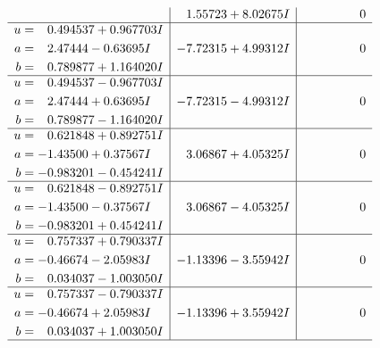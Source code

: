 \documentclass[1p]{elsarticle_modified}
\theoremstyle{definition}
\begin{document}
$$\begin{array}{c|c|c}
 & \phantom{-}1.55723 + 8.02675 I & \phantom{-0.000000 } 0 \\ \hline\begin{aligned}
u &= \phantom{-}0.494537 + 0.967703 I \\
a &= \phantom{-}2.47444 - 0.63695 I \\
b &= \phantom{-}0.789877 + 1.164020 I\end{aligned}
 & -7.72315 + 4.99312 I & \phantom{-0.000000 } 0 \\ \hline\begin{aligned}
u &= \phantom{-}0.494537 - 0.967703 I \\
a &= \phantom{-}2.47444 + 0.63695 I \\
b &= \phantom{-}0.789877 - 1.164020 I\end{aligned}
 & -7.72315 - 4.99312 I & \phantom{-0.000000 } 0 \\ \hline\begin{aligned}
u &= \phantom{-}0.621848 + 0.892751 I \\
a &= -1.43500 + 0.37567 I \\
b &= -0.983201 - 0.454241 I\end{aligned}
 & \phantom{-}3.06867 + 4.05325 I & \phantom{-0.000000 } 0 \\ \hline\begin{aligned}
u &= \phantom{-}0.621848 - 0.892751 I \\
a &= -1.43500 - 0.37567 I \\
b &= -0.983201 + 0.454241 I\end{aligned}
 & \phantom{-}3.06867 - 4.05325 I & \phantom{-0.000000 } 0 \\ \hline\begin{aligned}
u &= \phantom{-}0.757337 + 0.790337 I \\
a &= -0.46674 - 2.05983 I \\
b &= \phantom{-}0.034037 - 1.003050 I\end{aligned}
 & -1.13396 - 3.55942 I & \phantom{-0.000000 } 0 \\ \hline\begin{aligned}
u &= \phantom{-}0.757337 - 0.790337 I \\
a &= -0.46674 + 2.05983 I \\
b &= \phantom{-}0.034037 + 1.003050 I\end{aligned}
 & -1.13396 + 3.55942 I & \phantom{-0.000000 } 0\\
 \hline 
 \end{array}$$\newpage$$\begin{array}{c|c|c}  

\end{array}$$
\end{document}
